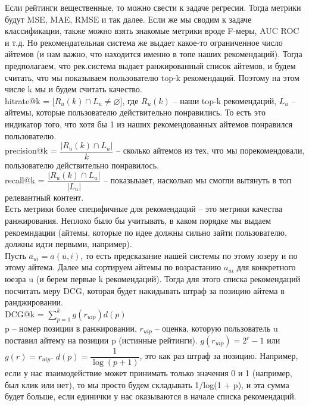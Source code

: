 Если рейтинги вещественные, то можно свести к задаче регресии. Тогда метрики будут MSE, MAE, RMSE и так далее. Если же мы сводим к задаче классификации, также можно взять знакомые метрики вроде F-меры, AUC ROC и т.д. Но рекомендательная система же выдает какое-то ограниченное число айтемов (и нам важно, что находится именно в топе наших рекомендаций). Тогда предполагаем, что рек.система выдает ранжированный список айтемов, и будем считать, что мы показываем пользователю top-k рекомендаций. Поэтому на этом числе k мы и будем считать качество. \\ 

hitrate@k = [$R_{u}(k) \cap L_{u} \ne \varnothing$], где $R_{u}(k)$ – наши top-k рекомендаций, $L_{u}$ -- айтемы, которые пользователю действительно понравились. То есть это индикатор того, что хотя бы 1 из наших рекомендованных айтемов понравился пользователю. \\ 

precision@k = $\dfrac{|R_{u}(k) \cap L_{u}|}{k}$ -- сколько айтемов из тех, что мы порекомендовали, пользователю действительно понравилось. \\ 

recall@k = $\dfrac{|R_{u}(k) \cap L_{u}|}{|L_{u}|}$ -- показыыает, насколько мы смогли вытянуть в топ релевантный контент. \\ 

Есть метрики более специфичные для рекомендаций -- это метрики качества ранжирования. Неплохо было бы учитывать, в каком порядке мы выдаем рекоемндации (айтемы, которые по идее должны сильно зайти пользователю, должны идти первыми, например). \\ 

Пусть $a_{ui} = a(u, i)$, то есть предсказание нашей системы по этому юзеру и по этому айтема. Далее мы сортируем айтемы по возрастанию $a_{ui}$ для конкретного юезра u (и берем первые k рекомендаций). Тогда для этого списка рекомендаций посчитать меру DCG, которая будет накидывать штраф за позицию айтема в ранджировании. \\ 

DCG@k = $\sum\limits_{p = 1}^{k} g(r_{uip})d(p)$ \\ 

p -- номер позиции в ранжировании, $r_{uip}$ -- оценка, которую пользователь u поставил айтему на позиции p (истинные рейтинги). $g(r_{uip}) = 2^{r} - 1$ или $g(r) = r_{uip}$.  $d(p) = \dfrac{1}{\log(p + 1)}$, это как раз штраф за позицию. Например, если у нас взаимодействие может принимать только значения 0 и 1 (например, был клик или нет), то мы просто будем складывать 1/log(1 + p), и эта сумма будет больше, если единички у нас оказываются в начале списка рекомендаций. \\ 

